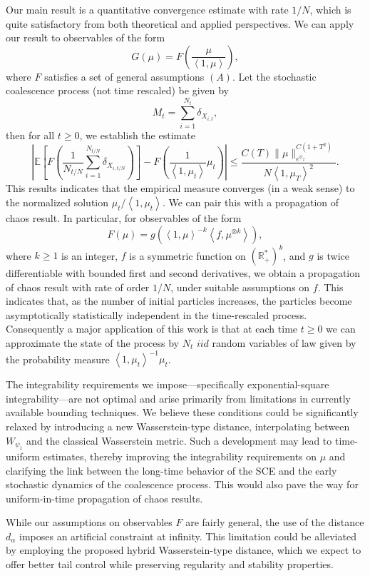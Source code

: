 \documentclass[11pt,a4paper]{article}
\newcommand{\A}{(A)}
\newcommand{\brac}[1]{\left\langle#1\right\rangle}
\begin{document}
Our main result is a quantitative convergence estimate with rate $1/N$, which is quite satisfactory from both theoretical and applied perspectives. We can apply our result to observables of the form
\[
G(\mu) = F\left( \frac{\mu}{\brac{1,\mu}} \right),
\]
where $F$ satisfies a set of general assumptions $\A$. Let the stochastic coalescence process (not time rescaled) be given by
\[
M_t =  \sum_{i=1}^{N_t} \delta_{X_{i,t}},
\]
then for all $t \geq 0$, we establish the estimate
\[
\left| \mathbb{E} \left[ F\left( \frac{1}{N_{t/N}} \sum_{i=1}^{N_{t/N}} \delta_{X_{i,t/N}} \right) \right] - F\left( \frac{1}{\brac{1,\mu_t}} \mu_t \right) \right| \leq \frac{C(T) \|\mu\|_{e^{\psi_2}}^{C(1 + T^2)}}{N \brac{1,\mu_T}^2}.
\]
This results indicates that the empirical measure converges (in a weak sense) to the normalized solution $\mu_t / \brac{1,\mu_t}$. We can pair this with a propagation of chaos result. In particular, for observables of the form
\[
F(\mu) = g\left(\brac{1,\mu}^{-k} \left\langle f, \mu^{\otimes k} \right\rangle \right),
\]
where $k \geq 1$ is an integer, $f$ is a symmetric function on $(\mathbb{R}_+^*)^k$, and $g$ is twice differentiable with bounded first and second derivatives, we obtain a propagation of chaos result with rate of order $1/N$, under suitable assumptions on $f$. This indicates that, as the number of initial particles increases, the particles become asymptotically statistically independent in the time-rescaled process. Consequently a major application of this work is that at each time $t \geq 0$ we can approximate the state of the process by $N_t$ $iid$ random variables of law given by the probability measure $\brac{1,\mu_t}^{-1} \mu_t$.

The integrability requirements we impose—specifically exponential-square integrability—are not optimal and arise primarily from limitations in currently available bounding techniques. We believe these conditions could be significantly relaxed by introducing a new Wasserstein-type distance, interpolating between $W_{\psi_1}$ and the classical Wasserstein metric. Such a development may lead to time-uniform estimates, thereby improving the integrability requirements on $\mu$ and clarifying the link between the long-time behavior of the SCE and the early stochastic dynamics of the coalescence process. This would also pave the way for uniform-in-time propagation of chaos results.

While our assumptions on observables $F$ are fairly general, the use of the distance $d_\alpha$ imposes an artificial constraint at infinity. This limitation could be alleviated by employing the proposed hybrid Wasserstein-type distance, which we expect to offer better tail control while preserving regularity and stability properties.
\end{document}
